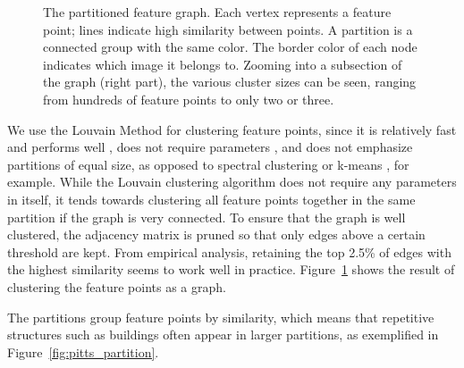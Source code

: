 \documentclass{article}
\begin{document}
\begin{figure}[t]
    \centering
{}
    \caption{The partitioned feature graph. Each vertex represents a 
        feature point; lines indicate high similarity between points. A 
        partition is a connected group with the same color. The border 
        color of each node indicates which image it belongs to.  Zooming 
    into a subsection of the graph (right part), the various cluster 
sizes can be seen, ranging from hundreds of feature points to only two 
or three.}
	\label{fig:graph}
\end{figure}

We use the Louvain Method \cite{blondel2008} for clustering feature 
points, since it is relatively fast and performs well 
\cite{lancichinetti2009}, does not require parameters 
\cite{blondel2008}, and does not emphasize partitions of equal size, as 
opposed to spectral clustering or k-means \cite{von2007}, for example.
While the Louvain clustering algorithm does not require any parameters 
in itself, it tends towards clustering all feature points together in 
the same partition if the graph is very connected.  To ensure that the 
graph is well clustered, the adjacency matrix is pruned so that only 
edges above a certain threshold are kept. From empirical analysis, 
retaining the top 2.5\% of edges with the highest similarity seems to 
work well in practice. Figure~\ref{fig:graph} shows the result of 
clustering the feature points as a graph.
%

The partitions group feature points by similarity, which means that 
repetitive structures such as buildings often appear in larger 
partitions, as exemplified in Figure~\ref{fig:pitts_partition}.
%
\end{document}

